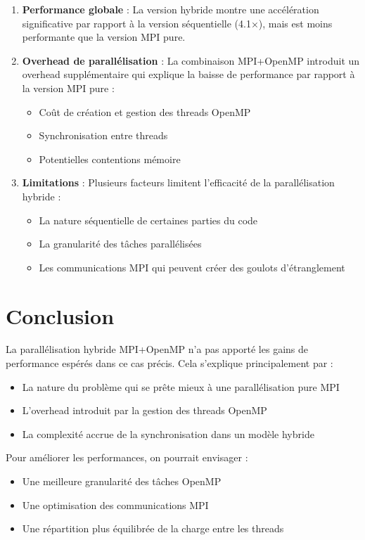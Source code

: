\documentclass[a4paper,12pt]{article}
\begin{document}
\begin{enumerate}
    \item \textbf{Performance globale} : La version hybride montre une accélération significative par rapport à la version séquentielle (4.1×), mais est moins performante que la version MPI pure.
    
    \item \textbf{Overhead de parallélisation} : La combinaison MPI+OpenMP introduit un overhead supplémentaire qui explique la baisse de performance par rapport à la version MPI pure :
    \begin{itemize}
        \item Coût de création et gestion des threads OpenMP
        \item Synchronisation entre threads
        \item Potentielles contentions mémoire
    \end{itemize}
    
    \item \textbf{Limitations} : Plusieurs facteurs limitent l'efficacité de la parallélisation hybride :
    \begin{itemize}
        \item La nature séquentielle de certaines parties du code
        \item La granularité des tâches parallélisées
        \item Les communications MPI qui peuvent créer des goulots d'étranglement
    \end{itemize}
\end{enumerate}

\section{Conclusion}

La parallélisation hybride MPI+OpenMP n'a pas apporté les gains de performance espérés dans ce cas précis. Cela s'explique principalement par :
\begin{itemize}
    \item La nature du problème qui se prête mieux à une parallélisation pure MPI
    \item L'overhead introduit par la gestion des threads OpenMP
    \item La complexité accrue de la synchronisation dans un modèle hybride
\end{itemize}

Pour améliorer les performances, on pourrait envisager :
\begin{itemize}
    \item Une meilleure granularité des tâches OpenMP
    \item Une optimisation des communications MPI
    \item Une répartition plus équilibrée de la charge entre les threads
\end{itemize}
\end{document}
